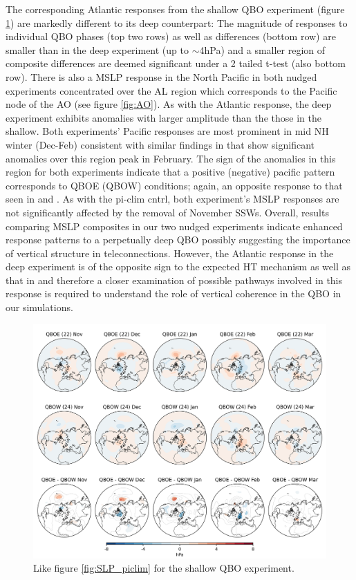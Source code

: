 The corresponding Atlantic responses from the shallow QBO experiment (figure \ref{fig:SLP_shallow}) are markedly different to its deep counterpart: The magnitude of responses to individual QBO phases (top two rows) as well as differences (bottom row) are smaller than in the deep experiment (up to $\sim$4hPa) and a smaller region of composite differences are deemed significant under a 2 tailed t-test (also bottom row). There is also a MSLP response in the North Pacific in both nudged experiments concentrated over the AL region which corresponds to the Pacific node of the AO (see figure \ref{fig:AO}). As with the Atlantic response, the deep experiment exhibits anomalies with larger amplitude than the those in the shallow. Both experiments' Pacific responses are most prominent in mid NH winter (Dec-Feb) consistent with similar findings in \cite{graySurface2018b} that show significant anomalies over this region peak in February. The sign of the anomalies in this region for both experiments indicate that a positive (negative) pacific pattern corresponds to QBOE (QBOW) conditions; again, an opposite response to that seen in \cite{andrewsObserved2019d} and \cite{graySurface2018b}. As with the pi-clim cntrl, both experiment's MSLP responses are not significantly affected by the removal of November SSWs. Overall, results comparing MSLP composites in our two nudged experiments indicate enhanced response patterns to a perpetually deep QBO possibly suggesting the importance of vertical structure in teleconnections. However, the Atlantic response in the deep experiment is of the opposite sign to the expected HT mechanism as well as that in \citep{andrewsObserved2019d} and therefore a closer examination of possible pathways involved in this response is required to understand the role of vertical coherence in the QBO in our simulations.

\begin{figure}[h!]
\begin{center}
\noindent\includegraphics[width =0.8\linewidth]{Figures/Figures-deepQBO/LAGGED_SLP_composites_individual_months_QBO_phases_U_s_50hPa_5thresh.png}
\caption[MSLP composites under different QBO phases in the shallow QBO simulation]{Like figure \ref{fig:SLP_piclim} for the shallow QBO experiment.}
\label{fig:SLP_shallow}
\end{center}
\end{figure}

